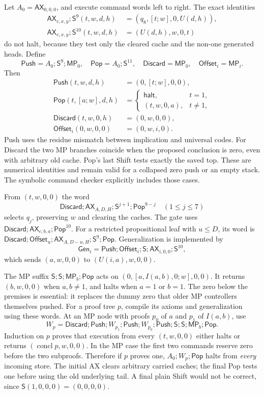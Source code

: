 Let $A_0=\mathsf{AX}_{0,0,0}$, and execute command words left to right.
The exact identities
\begin{align*}
 \mathsf{AX}_{c,x,y};\mathsf S^9(t,w,d,h)
   &=(q_8,[t;w],0,U(d,h)),\\
 \mathsf{AX}_{c,x,y};\mathsf S^{10}(t,w,d,h)
   &=(U(d,h),w,0,t)
\end{align*}
do not halt, because they test only the cleared cache and the non-one
generated heads. Define
\[
 \mathsf{Push}=A_0;\mathsf S^9;\mathsf{MP}_0,\quad
 \mathsf{Pop}=A_0;\mathsf S^{11},\quad
 \mathsf{Discard}=\mathsf{MP}_0,\quad
 \mathsf{Offset}_i=\mathsf{MP}_i.
\]
Then
\begin{align*}
 \mathsf{Push}(t,w,d,h)&=(0,[t;w],0,0),\\
 \mathsf{Pop}(t,[a;w],d,h)&=
    \begin{cases}\mathsf{halt},&t=1,\\(t,w,0,a),&t\ne1,\end{cases}\\
 \mathsf{Discard}(t,w,0,h)&=(0,w,0,0),\\
 \mathsf{Offset}_i(0,w,0,0)&=(0,w,i,0).
\end{align*}
Push uses the residue mismatch between implication and universal codes.
For Discard the two MP branches coincide when the proposed conclusion is
zero, even with arbitrary old cache. Pop's last Shift tests exactly the
saved top. These are numerical identities and remain valid for a collapsed
zero push or an empty stack. The symbolic command checker explicitly
includes those cases.

From $(t,w,0,0)$ the word
\[
 \mathsf{Discard};\mathsf{AX}_{A,D,H};\mathsf S^{j+1};
                 \mathsf{Pop}^{9-j}\quad(1\leq j\leq7)
\]
selects $q_j$, preserving $w$ and clearing the caches. The gate uses
$\mathsf{Discard};\mathsf{AX}_{c,b,a};\mathsf{Pop}^{10}$.
For a restricted propositional leaf with $u\leq D$, its word is
$\mathsf{Discard};\mathsf{Offset}_u;
\mathsf{AX}_{A,D-u,H};\mathsf S^9;\mathsf{Pop}$.
Generalization is implemented by
\[
 \mathsf{Gen}_i=\mathsf{Push};\mathsf{Offset}_i;\mathsf S;
              \mathsf{AX}_{i,0,0};\mathsf S^{10},
\]
which sends $(a,w,0,0)$ to $(U(i,a),w,0,0)$.

The MP suffix $\mathsf S;\mathsf S;\mathsf{MP}_b;\mathsf{Pop}$
acts on $(0,[a,I(a,b),0;w],0,0)$. It returns $(b,w,0,0)$
when $a,b\ne1$, and halts when $a=1$ or $b=1$.
The zero below the premises is essential: it replaces the dummy zero
that older MP controllers themselves pushed. For a proof tree $p$,
compile its axioms and generalization using these words. At an MP node
with proofs $p_0$ of $a$ and $p_1$ of $I(a,b)$, use
\[
 W_p=\mathsf{Discard};\mathsf{Push};W_{p_1};\mathsf{Push};
 W_{p_0};\mathsf{Push};\mathsf S;\mathsf S;\mathsf{MP}_b;
 \mathsf{Pop}.
\]
Induction on $p$ proves that execution from every $(t,w,0,0)$ either
halts or returns $(\operatorname{concl}p,w,0,0)$. In the MP case
the first two commands reserve zero before the two subproofs.
Therefore if $p$ proves one, $A_0;W_p;\mathsf{Pop}$ halts from
\emph{every} incoming store. The initial AX clears arbitrary carried
caches; the final Pop tests one before using the old underlying tail.
A final plain Shift would not be correct, since
$\mathsf S(1,0,0,0)=(0,0,0,0)$.


